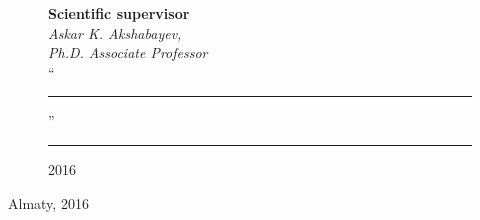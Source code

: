 \begin{titlepage}
    


    \begin{figure}[ht]
            \begin{minipage}[t]{0.6\linewidth}
                {\bf Scientific supervisor}\\

                {\em Askar K. Akshabayev,\\
                Ph.D. Associate Professor}\\
                
                ``\rule{2em}{0.4pt}'' \rule{8em}{0.4pt} 2016\\
         \end{minipage}
    \end{figure}
    
    \begin{center}
        \vfill
        Almaty, 2016
    \end{center}
  
    \end{titlepage}